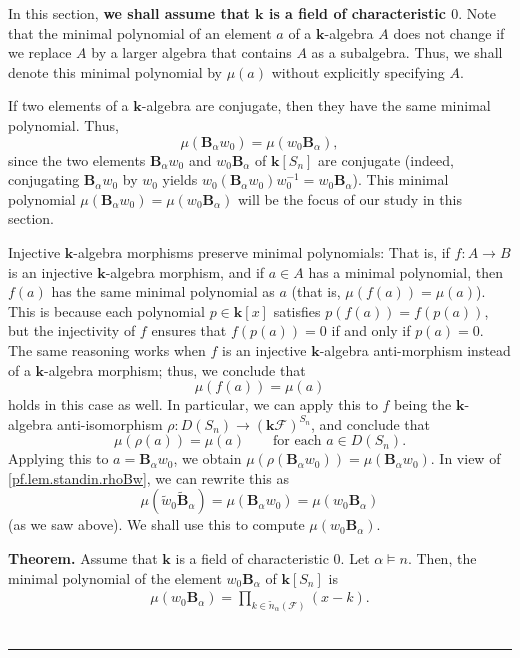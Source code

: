 \documentclass[12pt]{article}
\theoremstyle{definition}%
\newtheorem{thm}{Theorem}[section]
\theoremstyle{definition}%
\theoremstyle{remark}%
\newcommand{\tup}[1]{\left( #1 \right)}
\newcommand{\sbr}[1]{\left[ #1 \right]} %
\newcommand{\kk}{\mathbf{k}}
\newcommand{\ksn}{\kk\left[S_n\right]}
\newcommand{\kf}{\kk\mathcal{F}}
\newcommand{\kfsn}{\left(\kf\right)^{S_n}}
\newcommand{\dsn}{D\left(S_n\right)}
\newcommand{\BBa}{\mathbf{B}_{\alpha}}
\newcommand{\BBta}{\widetilde{\mathbf{B}}_{\alpha}}
\newcommand{\CF}{\mathcal{F}}
\newcommand{\wo}{w_0} %
\newcommand{\wotil}{\widetilde{w}_0}
\newcommand{\nna}{\widetilde{n}_{ \alpha } }%
\newenvironment{thm}[1][Theorem]{\noindent\textbf{#1.} }{\ \rule{0.5em}{0.5em}}
\begin{document}
In this section, \textbf{we shall assume that $\kk$ is a field of
characteristic $0$}. Note that the minimal polynomial of an element
$a$ of a $\kk$-algebra $A$ does not change if we replace $A$
by a larger algebra that contains $A$ as a subalgebra. Thus, we shall denote
this minimal polynomial by $\mu\tup{a}$ without explicitly
specifying $A$.

If two elements of a $\kk$-algebra are conjugate, then they have the
same minimal polynomial. Thus,
\[
\mu\tup{\BBa\wo} = \mu\tup{\wo\BBa} ,
\]
since the two elements $\BBa\wo$ and $\wo\BBa$ of $\ksn$ are conjugate
(indeed, conjugating $\BBa\wo$ by $\wo$ yields
$\wo\tup{\BBa\wo}\wo^{-1} = \wo\BBa$). This minimal polynomial
$\mu\tup{\BBa\wo} = \mu\tup{\wo\BBa}$ will be the focus of our study
in this section.

Injective $\kk$-algebra morphisms preserve minimal polynomials: That
is, if $f:A\to B$ is an injective $\kk$-algebra morphism, and
if $a\in A$ has a minimal polynomial, then
$f\tup{a}$ has the same minimal polynomial as $a$
(that is, $\mu\tup{f\tup{a}}  =\mu\tup{a}$).
This is because each polynomial $p\in
\kk\sbr{x}  $ satisfies $p\tup{f\tup{a}}
= f\tup{p\tup{a}}$, but the injectivity
of $f$ ensures that $f\tup{p\tup{a}} = 0$ if and
only if $p\tup{a} = 0$. The same reasoning works when
$f$ is an injective $\kk$-algebra anti-morphism instead of a
$\kk$-algebra morphism; thus, we conclude that
\begin{equation}
\mu\tup{ f\tup{a} } = \mu\tup{a}
\label{eq.mu.fa=a.antimor}
\end{equation}
holds in this case as well. In particular,
we can apply this to $f$ being the $\kk$-algebra anti-isomorphism
$\rho:\dsn \to \kfsn$, and conclude that
\[
\mu\tup{\rho\tup{a}}
= \mu\tup{a}
\qquad\text{for each } a \in \dsn.
\]
Applying this to $a = \BBa\wo$,
we obtain $\mu\tup{\rho\tup{\BBa\wo}}
= \mu\tup{\BBa\wo}$.
In view of \eqref{pf.lem.standin.rhoBw},
we can rewrite this as
\begin{equation}
\mu\tup{\wotil \BBta}
= \mu\tup{\BBa\wo}
= \mu\tup{\wo\BBa}
\label{eq.minpol.red-to-F}
\end{equation}
(as we saw above).
We shall use this to compute $\mu\tup{\wo\BBa}  $.

\begin{thm}
\label{thm.mp.1}
Assume that $\kk$ is a field of characteristic $0$.
Let $\alpha \models n$.
Then, the minimal polynomial of the element $\wo\BBa$ of $\ksn$ is
\begin{align}
\mu\tup{\wo\BBa}
=
\prod_{k \in \nna\tup{\CF}}\tup{x-k}  .
\label{eq.thm.mp.1.eq}
\end{align}
\end{thm}
\end{document}

